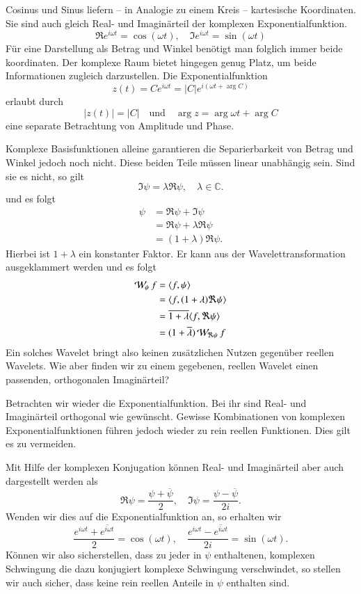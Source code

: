 Cosinus und Sinus liefern -- in Analogie zu einem Kreis -- kartesische Koordinaten. 
Sie sind auch gleich Real- und Imaginärteil der komplexen Exponentialfunktion.
\[
\Re e^{i\omega t} = \cos(\omega t), \quad \Im e^{i\omega t} = \sin(\omega t)
\]
Für eine Darstellung als Betrag und Winkel benötigt man folglich immer beide koordinaten.
Der komplexe Raum bietet hingegen genug Platz, um beide Informationen zugleich darzustellen.
Die Exponentialfunktion
\[
	z(t) = Ce^{i\omega t} = |C|e^{i(\omega t + \arg C)}
\]
erlaubt durch 
\[
	|z(t)| = |C| 
	\quad \text{und}\quad
	\arg z = \arg \omega t + \arg C
\]
eine separate Betrachtung von Amplitude und Phase.


Komplexe Basisfunktionen alleine garantieren die Separierbarkeit von Betrag und Winkel jedoch noch nicht.
Diese beiden Teile müssen linear unabhängig sein.
Sind sie es nicht, so gilt
\[\Im \psi = \lambda \Re \psi, \quad \lambda \in \mathbb C.\]
und es folgt
\begin{align*}
	\psi &= \Re \psi + \Im \psi\\
	&= \Re \psi + \lambda \Re \psi\\
	&= (1+\lambda) \Re \psi.
\end{align*}
Hierbei ist $1+\lambda$ ein konstanter Faktor. 
Er kann aus der Wavelettransformation ausgeklammert werden und es folgt
\begin{align*}
	\Wave_\psi f 
	&= \langle f, \psi \rangle \\
	&= \langle f, (1+\lambda) \Re \psi \rangle \\
	&= \overline{1+\lambda} \langle f, \Re \psi \rangle \\
	&= (1+\overline{\lambda}) \Wave_{\Re\psi}f
\end{align*}
Ein solches Wavelet bringt also keinen zusätzlichen Nutzen gegenüber reellen Wavelets.
Wie aber finden wir zu einem gegebenen, reellen Wavelet einen passenden, orthogonalen Imaginärteil?

Betrachten wir wieder die Exponentialfunktion.
Bei ihr sind Real- und Imaginärteil orthogonal wie gewünscht.
Gewisse Kombinationen von komplexen Exponentialfunktionen führen jedoch wieder zu rein reellen Funktionen.
Dies gilt es zu vermeiden.

Mit Hilfe der komplexen Konjugation können Real- und Imaginärteil aber auch dargestellt werden als
\[
\Re \psi = \frac{\psi + \overline\psi}{2} 
,\quad
\Im \psi = \frac{\psi - \overline\psi}{2i}.
\]
Wenden wir dies auf die Exponentialfunktion an, so erhalten wir
\begin{equation}
	\frac{e^{i\omega t} + \overline{e^{i\omega t}}}{2} = \cos(\omega t)
	,\quad
	\frac{e^{i\omega t} - \overline{e^{i\omega t}}}{2i} = \sin(\omega t). \label{complex:euler}
\end{equation}
Können wir also sicherstellen, dass zu jeder in $\psi$ enthaltenen, komplexen Schwingung die dazu konjugiert komplexe Schwingung verschwindet,
so stellen wir auch sicher, dass keine rein reellen Anteile in $\psi$ enthalten sind.

